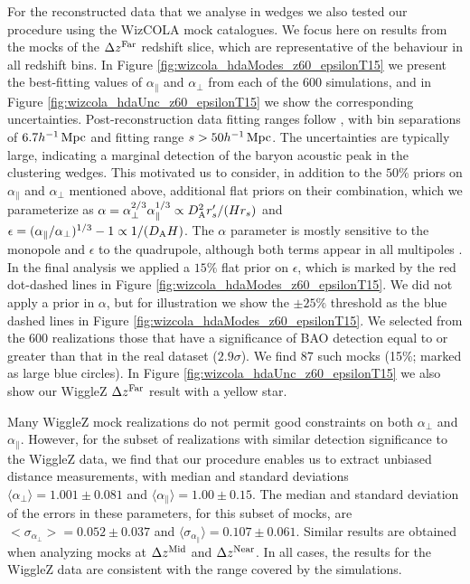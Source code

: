 \documentclass[a4paper,fleqn,usenatbib]{mnras}
\begin{document}
For the reconstructed data that we analyse in wedges we also tested our procedure using the WizCOLA mock catalogues.  We focus
here on results from the mocks of the $\Delta z^{\rm Far}$ redshift
slice, which are representative of the behaviour in all redshift bins.
In Figure \ref{fig:wizcola_hdaModes_z60_epsilonT15} we present the
best-fitting values of $\alpha_\parallel$ and $\alpha_\perp$ from each
of the 600 simulations, and in Figure
\ref{fig:wizcola_hdaUnc_z60_epsilonT15} we show the corresponding
uncertainties. Post-reconstruction data fitting ranges follow \citet{KazinKoda2014}, with bin 
separations of $6.7 h^{-1}\, {\rm Mpc}$ and fitting range $s > 50 h^{-1}\,{\rm Mpc}$. 
The uncertainties are typically large, indicating a
marginal detection of the baryon acoustic peak in the clustering
wedges.  This motivated us to consider, in addition to the $50\%$
priors on $\alpha_\parallel$ and $\alpha_\perp$ mentioned above,
additional flat priors on their combination, which we parameterize as
$\alpha = \alpha_\perp^{2/3} \alpha_\parallel^{1/3} \propto D_{\rm
  A}^2 r^\prime_s /(H r_s)$ and $\epsilon = (\alpha_\parallel/\alpha_\perp)^{1/3} - 1
\propto 1/(D_{\rm A} H)$.
The $\alpha$ parameter is mostly sensitive to
the monopole and $\epsilon$ to the quadrupole, although both terms appear in all
multipoles \citep[see][for a discussion]{PadmanabhanWhite2008}. In the
final analysis we applied a $15\%$ flat prior on $\epsilon$, which is
marked by the red dot-dashed lines in Figure
\ref{fig:wizcola_hdaModes_z60_epsilonT15}.  We did not apply a prior
in $\alpha$, but for illustration we show the $\pm 25\%$ threshold as
the blue dashed lines in Figure
\ref{fig:wizcola_hdaModes_z60_epsilonT15}.  We selected from the 600
realizations those that have a significance of BAO detection equal to
or greater than that in the real dataset ($2.9\sigma$).  We find 87
such mocks (15\%; marked as large blue circles).  In Figure
\ref{fig:wizcola_hdaUnc_z60_epsilonT15} we also show our WiggleZ
$\Delta z^{\rm Far}$ result with a yellow star.

Many WiggleZ mock realizations do not permit good constraints on both
$\alpha_\perp$ and $\alpha_\parallel$.  However, for the subset of
realizations with similar detection significance to the WiggleZ data,
we find that our procedure enables us to extract unbiased distance
measurements, with median and standard deviations $\langle \alpha_\perp \rangle =
1.001 \pm 0.081$ and $\langle \alpha_\parallel \rangle = 1.00 \pm 0.15$.  The
median and standard deviation of the errors in these parameters, for
this subset of mocks, are $<\sigma_{\alpha_\perp}> = 0.052 \pm 0.037$
and $\langle \sigma_{\alpha_\parallel} \rangle = 0.107 \pm 0.061$.  Similar results
are obtained when analyzing mocks at $\Delta z^{\rm Mid}$ and $\Delta
z^{\rm Near}$.  In all cases, the results for the WiggleZ data are
consistent with the range covered by the simulations.
\end{document}
